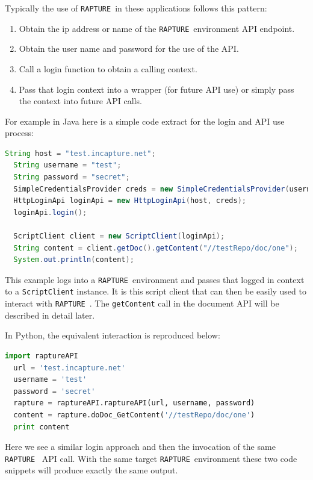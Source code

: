 \documentclass[12pt,twoside,a4paper]{book}
\newcommand{\Rapture}{\Verb+RAPTURE+~}
\begin{document}
Typically the use of \Rapture in these applications follows this pattern:

\begin{enumerate}
  \item{Obtain the ip address or name of the \Rapture environment API endpoint.}
  \item{Obtain the user name and password for the use of the API.}
  \item{Call a login function to obtain a calling context.}
  \item{Pass that login context into a wrapper (for future API use) or simply pass the context into future API calls.}
\end{enumerate}

For example in Java here is a simple code extract for the login and API use process:

\begin{lstlisting}[caption={Java simple example}, language=Java]
  String host = "test.incapture.net";
  String username = "test";
  String password = "secret";
  SimpleCredentialsProvider creds = new SimpleCredentialsProvider(username, password);
  HttpLoginApi loginApi = new HttpLoginApi(host, creds);
  loginApi.login();

  ScriptClient client = new ScriptClient(loginApi);
  String content = client.getDoc().getContent("//testRepo/doc/one");
  System.out.println(content);
\end{lstlisting}

This example logs into a \Rapture environment and passes that logged in context to a \verb+ScriptClient+
instance. It is this script client that can then be easily used to interact with \Rapture. The
\verb+getContent+ call in the document API will be described in detail later.

In Python, the equivalent interaction is reproduced below:

\begin{lstlisting}[caption={Python simple example}, language=Python]
  import raptureAPI
  url = 'test.incapture.net'
  username = 'test'
  password = 'secret'
  rapture = raptureAPI.raptureAPI(url, username, password)
  content = rapture.doDoc_GetContent('//testRepo/doc/one')
  print content
\end{lstlisting}

Here we see a similar login approach and then the invocation of the same \Rapture
API call. With the same target \Rapture environment these two code snippets will
produce exactly the same output.
\end{document}
